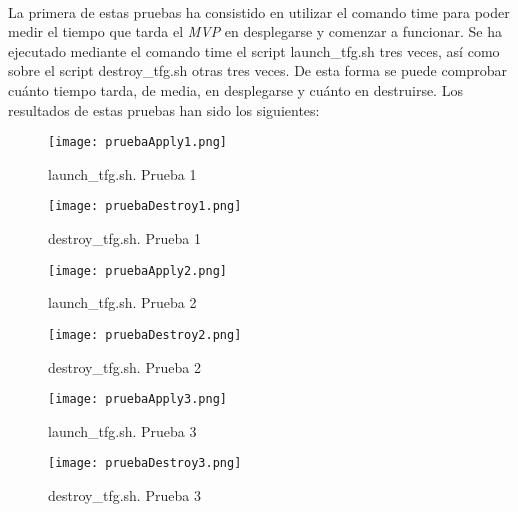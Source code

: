 \documentclass[../../memoria.tex]{subfiles}
\begin{document}
\paragraph{}
La primera de estas pruebas ha consistido en utilizar el comando time \cite{timelinuxcom} para poder medir el tiempo que tarda el \textit{MVP} en desplegarse y comenzar a funcionar. Se ha ejecutado mediante el comando time el script launch\_tfg.sh tres veces, así como sobre el script destroy\_tfg.sh otras tres veces. De esta forma se puede comprobar cuánto tiempo tarda, de media, en desplegarse y cuánto en destruirse. Los resultados de estas pruebas han sido los siguientes:

\begin{figure}[H]
    \centering
    \begin{minipage}{.5\textwidth}
        \centering
        \texttt{[image: pruebaApply1.png]}
        \caption{launch\_tfg.sh. Prueba 1}
        \label{fig:pruebaApply1}
    \end{minipage}%
    \begin{minipage}{.5\textwidth}
        \centering
        \texttt{[image: pruebaDestroy1.png]}
        \caption{destroy\_tfg.sh. Prueba 1}
        \label{fig:pruebaDestroy1}
    \end{minipage}
\end{figure}

\begin{figure}[H]
    \centering
    \begin{minipage}{.5\textwidth}
        \centering
        \texttt{[image: pruebaApply2.png]}
        \caption{launch\_tfg.sh. Prueba 2}
        \label{fig:pruebaApply2}
    \end{minipage}%
    \begin{minipage}{.5\textwidth}
        \centering
        \texttt{[image: pruebaDestroy2.png]}
        \caption{destroy\_tfg.sh. Prueba 2}
        \label{fig:pruebaDestroy2}
    \end{minipage}
\end{figure}

\begin{figure}[H]
    \centering
    \begin{minipage}{.5\textwidth}
        \centering
        \texttt{[image: pruebaApply3.png]}
        \caption{launch\_tfg.sh. Prueba 3}
        \label{fig:pruebaApply3}
    \end{minipage}%
    \begin{minipage}{.5\textwidth}
        \centering
        \texttt{[image: pruebaDestroy3.png]}
        \caption{destroy\_tfg.sh. Prueba 3}
        \label{fig:pruebaDestroy3}
    \end{minipage}
\end{figure}
\end{document}
